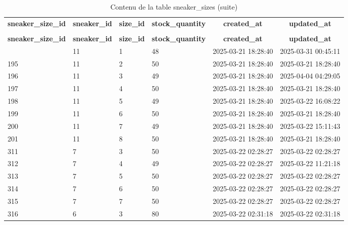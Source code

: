 %
%
 \begin{longtable}{|l|l|l|l|l|l|} 
 \hline \endhead \hline \endfoot \hline 
 \caption{Contenu de la table sneaker\_sizes} \label{tab:sneaker_sizes-data} \\\hline \multicolumn{1}{|c|}{\textbf{sneaker\_size\_id}} & \multicolumn{1}{|c|}{\textbf{sneaker\_id}} & \multicolumn{1}{|c|}{\textbf{size\_id}} & \multicolumn{1}{|c|}{\textbf{stock\_quantity}} & \multicolumn{1}{|c|}{\textbf{created\_at}} & \multicolumn{1}{|c|}{\textbf{updated\_at}} \\ \hline \hline  \endfirsthead 
\caption{Contenu de la table sneaker\_sizes (suite)} \\ \hline \multicolumn{1}{|c|}{\textbf{sneaker\_size\_id}} & \multicolumn{1}{|c|}{\textbf{sneaker\_id}} & \multicolumn{1}{|c|}{\textbf{size\_id}} & \multicolumn{1}{|c|}{\textbf{stock\_quantity}} & \multicolumn{1}{|c|}{\textbf{created\_at}} & \multicolumn{1}{|c|}{\textbf{updated\_at}} \\ \hline \hline \endhead \endfoot
194 & 11 & 1 & 48 & 2025-03-21 18:28:40 & 2025-03-31 00:45:11 \\ \hline 
195 & 11 & 2 & 50 & 2025-03-21 18:28:40 & 2025-03-21 18:28:40 \\ \hline 
196 & 11 & 3 & 49 & 2025-03-21 18:28:40 & 2025-04-04 04:29:05 \\ \hline 
197 & 11 & 4 & 50 & 2025-03-21 18:28:40 & 2025-03-21 18:28:40 \\ \hline 
198 & 11 & 5 & 49 & 2025-03-21 18:28:40 & 2025-03-22 16:08:22 \\ \hline 
199 & 11 & 6 & 50 & 2025-03-21 18:28:40 & 2025-03-21 18:28:40 \\ \hline 
200 & 11 & 7 & 49 & 2025-03-21 18:28:40 & 2025-03-22 15:11:43 \\ \hline 
201 & 11 & 8 & 50 & 2025-03-21 18:28:40 & 2025-03-21 18:28:40 \\ \hline 
311 & 7 & 3 & 50 & 2025-03-22 02:28:27 & 2025-03-22 02:28:27 \\ \hline 
312 & 7 & 4 & 49 & 2025-03-22 02:28:27 & 2025-03-22 11:21:18 \\ \hline 
313 & 7 & 5 & 50 & 2025-03-22 02:28:27 & 2025-03-22 02:28:27 \\ \hline 
314 & 7 & 6 & 50 & 2025-03-22 02:28:27 & 2025-03-22 02:28:27 \\ \hline 
315 & 7 & 7 & 50 & 2025-03-22 02:28:27 & 2025-03-22 02:28:27 \\ \hline 
316 & 6 & 3 & 80 & 2025-03-22 02:31:18 & 2025-03-22 02:31:18 \\ \hline 

\end{longtable}
